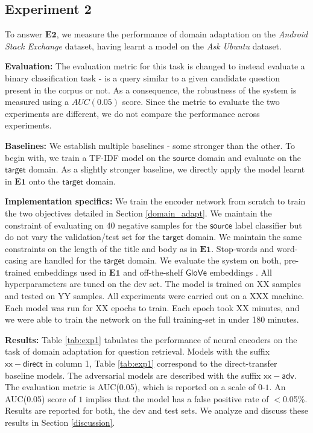 \documentclass{sigkddExp}
\begin{document}
\subsection{Experiment 2} 
To answer $\mathbf{E2}$, we measure the performance of domain adaptation on the \textit{Android Stack Exchange} dataset, having learnt a model on the \textit{Ask Ubuntu} dataset.

\textbf{Evaluation:} The evaluation metric for this task is changed to instead evaluate a binary classification task - is a query similar to a given candidate question present in the corpus or not. As a consequence, the robustness of the system is measured using a $AUC(0.05)$ score. Since the metric to evaluate the two experiments are different, we do not compare the performance across experiments.

\textbf{Baselines:} We establish multiple baselines - some stronger than the other. To begin with, we train a TF-IDF model on the $\textsf{source}$ domain and evaluate on the $\textsf{target}$ domain. As a slightly stronger baseline, we directly apply the model learnt in $\mathbf{E1}$ onto the $\textsf{target}$ domain.

\textbf{Implementation specifics:} We train the encoder network from scratch to train the two objectives detailed in Section \ref{domain_adapt}. We maintain the constraint of evaluating on 40 negative samples for the $\mathsf{source}$ label classifier but do not vary the validation/test set for the $\mathsf{target}$ domain. We maintain the same constraints on the length of the title and body as in $\mathbf{E1}$. Stop-words and word-casing are handled for the $\mathsf{target}$ domain. We evaluate the system on both, pre-trained embeddings used in $\mathbf{E1}$ and off-the-shelf $\mathsf{GloVe}$ embeddings \cite{pennington2014glove}. All hyperparameters are tuned on the dev set. The model is trained on {\color{red} XX samples and tested on YY samples. All experiments were carried out on a XXX machine. Each model was run for {\color{red} XX epochs} to train. Each epoch took XX minutes, and we were able to train the network on the full training-set in under 180 minutes.}

\textbf{Results:} Table \ref{tab:exp1} tabulates the performance of neural encoders on the task of domain adaptation for question retrieval. Models with the suffix $\mathsf{xx-direct}$ in column 1, Table \ref{tab:exp1} correspond to the direct-transfer baseline models. The adversarial models are described with the suffix $\mathsf{xx-adv}$. The evaluation metric is AUC(0.05), which is reported on a scale of $0$-$1$. An AUC(0.05) score of $1$ implies that {\color{red}the model has a false positive rate of $<$0.05\%}. Results are reported for both, the dev and test sets. We analyze and discuss these results in Section \ref{discussion}.
\end{document}
